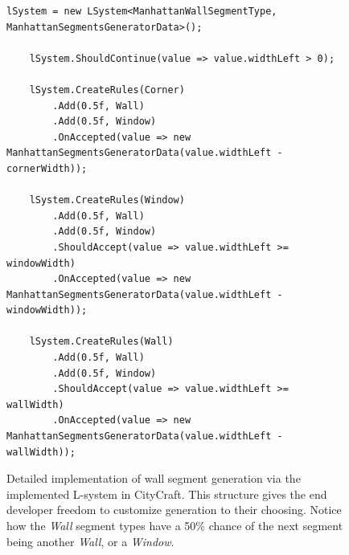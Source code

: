 \begin{figure}[H]
  \begin{lstlisting}[]
    lSystem = new LSystem<ManhattanWallSegmentType, ManhattanSegmentsGeneratorData>();

    lSystem.ShouldContinue(value => value.widthLeft > 0);

    lSystem.CreateRules(Corner)
        .Add(0.5f, Wall)
        .Add(0.5f, Window)
        .OnAccepted(value => new ManhattanSegmentsGeneratorData(value.widthLeft - cornerWidth));

    lSystem.CreateRules(Window)
        .Add(0.5f, Wall)
        .Add(0.5f, Window)
        .ShouldAccept(value => value.widthLeft >= windowWidth)
        .OnAccepted(value => new ManhattanSegmentsGeneratorData(value.widthLeft - windowWidth));

    lSystem.CreateRules(Wall)
        .Add(0.5f, Wall)
        .Add(0.5f, Window)
        .ShouldAccept(value => value.widthLeft >= wallWidth)
        .OnAccepted(value => new ManhattanSegmentsGeneratorData(value.widthLeft - wallWidth));
  \end{lstlisting}
  \caption{Detailed implementation of wall segment generation via the implemented L-system in CityCraft. This structure gives the end developer freedom to customize generation to their choosing. Notice how the \textit{Wall} segment types have a 50\% chance of the next segment being another \textit{Wall}, or a \textit{Window}.}
  \label{fig:lsystem_example}
\end{figure}
